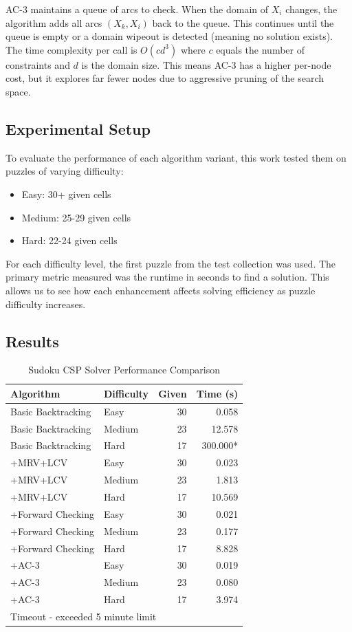 \documentclass[letterpaper]{article}
\begin{document}
AC-3 maintains a queue of arcs to check. When the domain of $X_i$ changes, the algorithm adds all arcs $(X_k, X_i)$ back to the queue. This continues until the queue is empty or a domain wipeout is detected (meaning no solution exists). The time complexity per call is $O(cd^3)$ where $c$ equals the number of constraints and $d$ is the domain size. This means AC-3 has a higher per-node cost, but it explores far fewer nodes due to aggressive pruning of the search space.

\subsection{Experimental Setup}

To evaluate the performance of each algorithm variant, this work tested them on puzzles of varying difficulty:
\begin{itemize}
\item Easy: 30+ given cells
\item Medium: 25-29 given cells
\item Hard: 22-24 given cells
\end{itemize}

For each difficulty level, the first puzzle from the test collection was used. The primary metric measured was the runtime in seconds to find a solution. This allows us to see how each enhancement affects solving efficiency as puzzle difficulty increases.

\subsection{Results}

\begin{table}[h]
\centering
\caption{Sudoku CSP Solver Performance Comparison}
\label{tab:sudoku-results}
\begin{tabular}{@{}llrr@{}}
\toprule
\textbf{Algorithm} & \textbf{Difficulty} & \textbf{Given} & \textbf{Time (s)} \\
\midrule
Basic Backtracking & Easy & 30 & 0.058 \\
Basic Backtracking & Medium & 23 & 12.578 \\
Basic Backtracking & Hard & 17 & 300.000* \\
\midrule
+MRV+LCV & Easy & 30 & 0.023 \\
+MRV+LCV & Medium & 23 & 1.813 \\
+MRV+LCV & Hard & 17 & 10.569 \\
\midrule
+Forward Checking & Easy & 30 & 0.021 \\
+Forward Checking & Medium & 23 & 0.177 \\
+Forward Checking & Hard & 17 & 8.828 \\
\midrule
+AC-3 & Easy & 30 & 0.019 \\
+AC-3 & Medium & 23 & 0.080 \\
+AC-3 & Hard & 17 & 3.974 \\
\bottomrule
\multicolumn{4}{l}{\footnotesize *Timeout - exceeded 5 minute limit}
\end{tabular}
\end{table}
\end{document}
